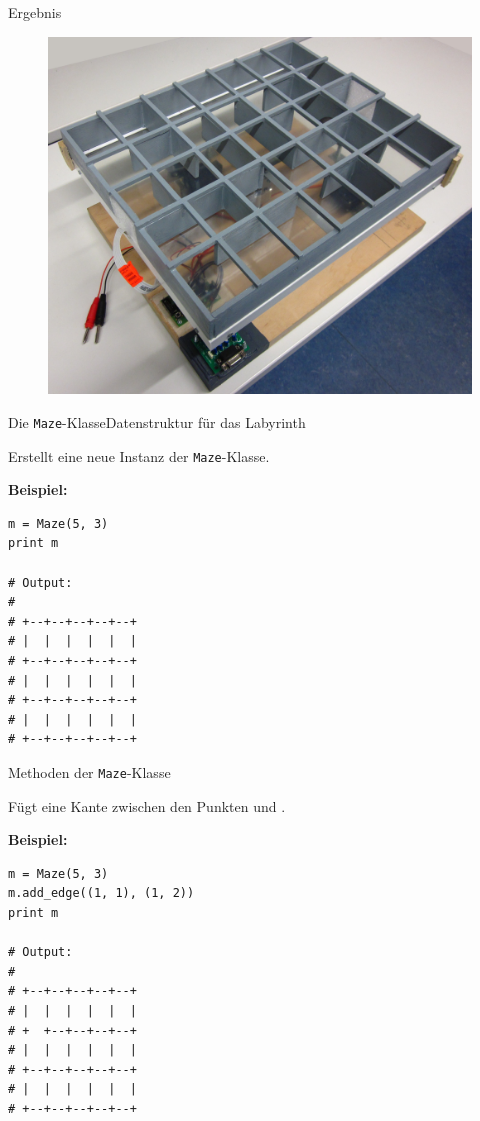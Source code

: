 \documentclass{beamer}
\begin{document}
\begin{frame}[fragile,t]{Ergebnis}
\begin{figure}
  \centering
  \includegraphics[scale=.2]{roboter_badly-photoshoped}
\end{figure}
\end{frame}

\begin{frame}[fragile,t]{Die \verb~Maze~-Klasse}{Datenstruktur für das Labyrinth}

\smallskip\noindent
Erstellt eine neue Instanz der \verb~Maze~-Klasse.

\medskip\noindent
\textbf{Beispiel:}

\medskip
\begin{verbatim}
m = Maze(5, 3)
print m

# Output:
#
# +--+--+--+--+--+
# |  |  |  |  |  |
# +--+--+--+--+--+
# |  |  |  |  |  |
# +--+--+--+--+--+
# |  |  |  |  |  |
# +--+--+--+--+--+
\end{verbatim}
\end{frame}

\begin{frame}[fragile,t]{Methoden der \verb~Maze~-Klasse}

\smallskip\noindent
Fügt eine Kante zwischen den Punkten  und .

\medskip\noindent
\textbf{Beispiel:}

\medskip
\begin{verbatim}
m = Maze(5, 3)
m.add_edge((1, 1), (1, 2))
print m

# Output:
#
# +--+--+--+--+--+
# |  |  |  |  |  |
# +  +--+--+--+--+
# |  |  |  |  |  |
# +--+--+--+--+--+
# |  |  |  |  |  |
# +--+--+--+--+--+
\end{verbatim}
\end{frame}
\end{document}
